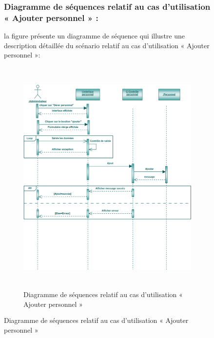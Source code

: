 \documentclass[12 pt]{report}
\begin{document}
\begin{figure}[h]
\begin{center}
\subsubsection{Diagramme de séquences relatif au cas d’utilisation « Ajouter personnel » :}
la figure   présente un diagramme de séquence qui illustre une description détaillée du scénario relatif au cas d’utilisation «  Ajouter personnel »: 
{\begin{figure}[h]
 \begin{center}
\includegraphics[width= 14 cm ,height=  12cm]{sap.PNG}
\caption{Diagramme de séquences relatif au cas d’utilisation « Ajouter personnel  »}

\end{center}
\end{figure}}
\newpage

\end{center}
\end{figure}
\end{document}
